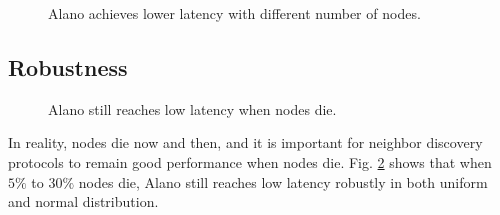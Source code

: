 \begin{figure}[!h]
\centering
{}
\hspace{0.01in}
\caption{Alano achieves lower latency with different number of nodes.}
\label{fig_node}
\end{figure}

\subsection{Robustness}

\begin{figure}[!h]
\centering
{}
\hspace{0.01in}
\caption{Alano still reaches low latency when nodes die.}
\label{fig_robust}
\end{figure}

In reality, nodes die now and then, and it is important for neighbor discovery protocols to remain good performance when nodes die. Fig. \ref{fig_robust} shows that when $5\%$ to $30\%$ nodes die, Alano still reaches low latency robustly in both uniform and normal distribution.

